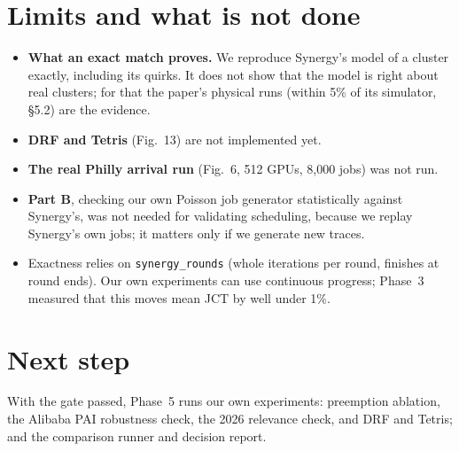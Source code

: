 \documentclass[11pt,a4paper]{article}
\newcommand{\code}[1]{\texttt{#1}}
\begin{document}
\section{Limits and what is not done}
\begin{itemize}
  \item \textbf{What an exact match proves.} We reproduce Synergy's model of a cluster exactly, including its
        quirks. It does not show that the model is right about real clusters; for that the paper's physical runs
        (within 5\% of its simulator, \S5.2) are the evidence.
  \item \textbf{DRF and Tetris} (Fig.~13) are not implemented yet.
  \item \textbf{The real Philly arrival run} (Fig.~6, 512 GPUs, 8{,}000 jobs) was not run.
  \item \textbf{Part B}, checking our own Poisson job generator statistically against Synergy's, was not needed for
        validating scheduling, because we replay Synergy's own jobs; it matters only if we generate new traces.
  \item Exactness relies on \code{synergy\_rounds} (whole iterations per round, finishes at round ends). Our own
        experiments can use continuous progress; Phase~3 measured that this moves mean JCT by well under 1\%.
\end{itemize}

\section{Next step}
With the gate passed, Phase~5 runs our own experiments: preemption ablation, the Alibaba PAI robustness check,
the 2026 relevance check, and DRF and Tetris; and the comparison runner and decision report.
\end{document}
